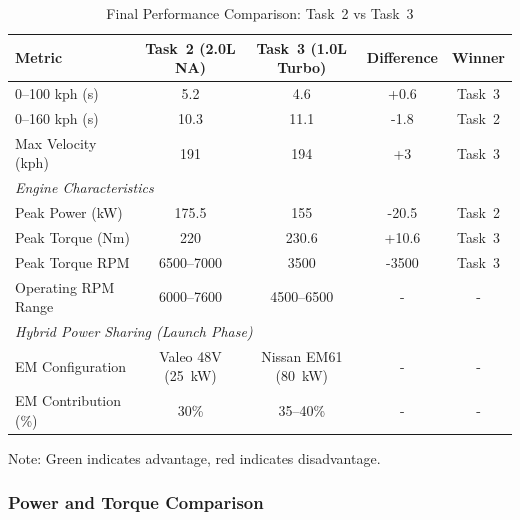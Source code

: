 \begin{table}[H]
\centering
\caption{Final Performance Comparison: Task~2 vs Task~3}
\label{tab:final_comparison}
\small
\begin{tabular}{@{}lcccc@{}}
\toprule
\textbf{Metric} & \textbf{Task~2 (2.0L NA)} & \textbf{Task~3 (1.0L Turbo)} & \textbf{Difference} & \textbf{Winner} \\
\midrule
0--100 kph (s) & \textcolor{optimizedcolor}{5.2} & \textcolor{optimizedcolor}{4.6} & \textcolor{improvementcolor}{+0.6} & \textcolor{improvementcolor}{Task~3} \\
0--160 kph (s) & \textcolor{optimizedcolor}{10.3} & \textcolor{optimizedcolor}{11.1} & \textcolor{regressioncolor}{-1.8} & \textcolor{improvementcolor}{Task~2}\\
Max Velocity (kph) & \textcolor{optimizedcolor}{191} & \textcolor{optimizedcolor}{194} & \textcolor{improvementcolor}{+3} & \textcolor{improvementcolor}{Task~3} \\
\midrule
\multicolumn{5}{l}{\textit{Engine Characteristics}} \\
Peak Power (kW) & 175.5 & 155 & \textcolor{regressioncolor}{-20.5} & \textcolor{improvementcolor}{Task~2} \\
Peak Torque (Nm) & 220 & 230.6 & \textcolor{improvementcolor}{+10.6} & \textcolor{improvementcolor}{Task~3} \\
Peak Torque RPM & 6500--7000 & 3500 & \textcolor{improvementcolor}{-3500} & \textcolor{improvementcolor}{Task~3} \\
Operating RPM Range & 6000--7600 & 4500--6500 & - & - \\
\midrule
\multicolumn{5}{l}{\textit{Hybrid Power Sharing (Launch Phase)}} \\
EM Configuration & Valeo 48V (25~kW) & Nissan EM61 (80~kW) & - & - \\
EM Contribution (\%) & 30\% & 35--40\% & - & - \\
\bottomrule
\end{tabular}
\end{table}

Note: Green indicates advantage, red indicates disadvantage.


\subsubsection{Power and Torque Comparison}

